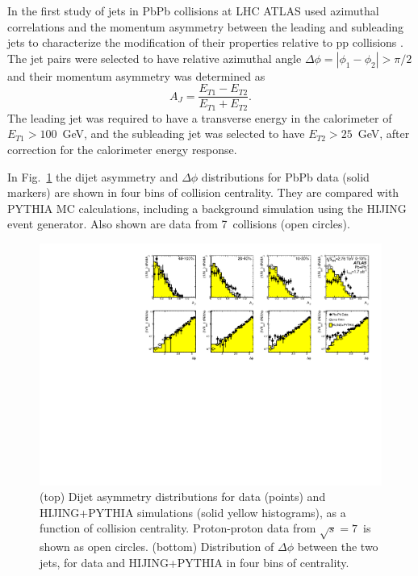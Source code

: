 In the first study of jets in PbPb collisions at LHC ATLAS used azimuthal correlations and the 
momentum asymmetry between the leading and subleading jets to characterize the modification
of their properties relative to pp collisions \cite{Aad:2010bu}.
The jet pairs were selected to have relative azimuthal angle $\Delta \phi =|\phi_1-\phi_2| > \pi/2$
and their momentum asymmetry was determined as
\begin{equation}
A_J = \frac{E_{T1}-E_{T2}}{E_{T1}+E_{T2}}.
\end{equation}
The leading jet was required to have a transverse energy in the calorimeter of $E_{T1} > 100$~GeV,
and the subleading jet was selected to have $E_{T2} > 25$~GeV, after correction for 
the calorimeter energy response. 

In Fig.~\ref{fig:GR:final_4x2} the dijet asymmetry and $\Delta\phi$ distributions for PbPb data (solid markers) 
are shown in four bins of collision centrality. They are compared with PYTHIA MC calculations, including a 
background simulation using the HIJING event generator. Also shown are data from 7\TeV\
\pp collisions (open circles).
\begin{figure}[thb]
\begin{center}
\includegraphics[width=0.9\mboxwidth]{jetfigures/final_4x2_23_newpp.pdf}
\caption{
(top) Dijet asymmetry distributions for data (points) and HIJING+PYTHIA simulations (solid yellow histograms),
as a function of collision centrality.  Proton-proton data from $\sqrt{s}=7$\TeV\ is shown as open circles.
(bottom) Distribution of $\Delta\phi$ between the two jets, for data and HIJING+PYTHIA in four bins of centrality.
\label{fig:GR:final_4x2}
}
\end{center}
\end{figure}


